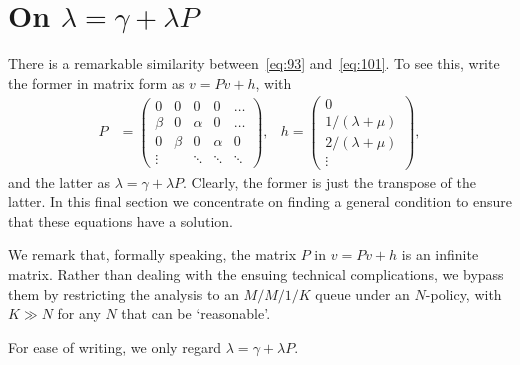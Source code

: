 



\section{On $\lambda = \gamma + \lambda P$}
\label{sec:lambda-=-gamma}

There is a remarkable similarity between~\cref{eq:93} and~\cref{eq:101}.
To see this, write the former in matrix form as $v = Pv + h$, 
with \begin{align*}
  P &=
  \begin{pmatrix}
    0 & 0 & 0 & 0&  \hdots\\
    \beta & 0  & \alpha & 0 & \hdots \\
    0 & \beta & 0 & \alpha  & 0 \\
    \vdots &  & \ddots & \ddots& \ddots
  \end{pmatrix},
& h =
                   \begin{pmatrix}
                     0 \\
                     1/(\lambda + \mu)\\
                     2/(\lambda + \mu)\\
                     \vdots
                   \end{pmatrix},
\end{align*}
and the latter as $\lambda = \gamma + \lambda P$.
Clearly, the former is just the transpose of the latter.
In this final section we concentrate on finding a general condition to ensure that these equations have a solution. 

We remark that, formally speaking, the matrix $P$ in $v=Pv +h$ is an infinite matrix.
Rather than dealing with the ensuing technical complications, we bypass them by restricting the analysis to an $M/M/1/K$ queue under an $N$-policy, with $K\gg N$ for any $N$ that can be `reasonable'.

For ease of writing, we only regard $\lambda = \gamma + \lambda P$.

